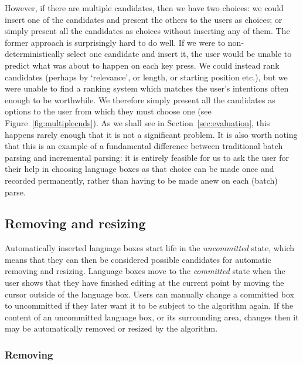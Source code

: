 \documentclass[sigplan,screen]{acmart}\settopmatter{printfolios=true,printccs=false,printacmref=false}
\begin{document}
\label{multiple candidates}
However, if there are multiple candidates, then we have two choices: we could
insert one of the candidates and present the others to the users as choices; or
simply present all the candidates as choices without inserting
any of them. The former approach is surprisingly hard to do well. If we were to
non-deterministically select one candidate and insert it, the user would be
unable to predict what was about to happen on each key press. We could instead
rank candidates (perhaps by `relevance', or length, or starting position etc.),
but we were unable to find a ranking system which matches the user's intentions
often enough to be worthwhile. We therefore simply present all the candidates
as options to the user from which they must choose one (see Figure~\ref{fig:multiplecnds}). As we shall see in
Section~\ref{sec:evaluation}, this happens rarely enough that it is not a
significant problem. It is also worth noting that this is an
example of a fundamental difference between traditional batch parsing and
incremental parsing: it is entirely feasible for us
to ask the user for their help in choosing language boxes as that choice can
be made once and recorded permanently, rather than having to be made anew
on each (batch) parse.


\begin{center}
\end{center}


\subsection{Removing and resizing}

Automatically inserted language boxes start life in the \emph{uncommitted}
state, which means that they can then be considered possible candidates for
automatic removing and resizing. Language boxes move to the \emph{committed}
state when the user shows that they have finished
editing at the current point by moving the cursor outside of the language box.
Users can manually change a committed box to uncommitted if they
later want it to be subject to the algorithm again. If the content of an
uncommitted language box, or its surrounding area, changes then it may be
automatically removed or resized by the algorithm.


\subsubsection{Removing}
\label{sec:removing}
\end{document}
